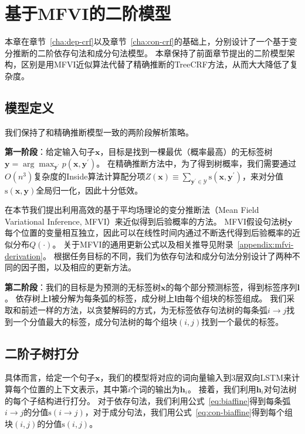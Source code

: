 \section{基于MFVI的二阶模型}\label{sec:vi-2o-approach}

本章在章节~\ref{cha:dep-crf}以及章节~\ref{cha:con-crf}的基础上，分别设计了一个基于变分推断的二阶依存句法和成分句法模型。
本章保持了前面章节提出的二阶模型架构，区别是用MFVI近似算法代替了精确推断的TreeCRF方法，从而大大降低了复杂度。

\subsection{模型定义}\label{sec:vi-model-definition}

我们保持了和精确推断模型一致的两阶段解析策略。

\noindent\textbf{第一阶段}：给定输入句子$\boldsymbol{x}$，目标是找到一棵最优（概率最高）的无标签树$\boldsymbol{y}=\arg\max_{\boldsymbol{y}^{\prime}}p(\boldsymbol{x},\boldsymbol{y}^{\prime})$。
在精确推断方法中，为了得到树概率，我们需要通过$O(n^3)$复杂度的Inside算法计算配分项$Z(\boldsymbol{x})\equiv\sum_{\boldsymbol{y}^{\prime}\in\mathcal{Y}}\mathrm{s}(\boldsymbol{x},\boldsymbol{y}^{\prime})$，来对分值$\mathrm{s}(\boldsymbol{x},\boldsymbol{y})$全局归一化，因此十分低效。

在本节我们提出利用高效的基于平均场理论的变分推断法（Mean Field Variational Inference, MFVI）来近似得到后验概率的方法。
MFVI假设句法树$\boldsymbol{y}$每个位置的变量相互独立，因此可以在线性时间内通过不断迭代得到后验概率的近似分布$Q(\cdot)$。
关于MFVI的通用更新公式以及相关推导见附录~\ref{appendix:mfvi-derivation}。
根据任务目标的不同，我们为依存句法和成分句法分别设计了两种不同的因子图，以及相应的更新方法。

\noindent\textbf{第二阶段}：我们的目标是为预测的无标签树$\boldsymbol{x}$的每个部分预测标签，得到标签序列$\boldsymbol{l}$。
依存树上$\boldsymbol{l}$被分解为每条弧的标签，成分树上$\boldsymbol{l}$由每个组块的标签组成。
我们采取和前述一样的方法，以贪婪解码的方式，为无标签依存句法树的每条弧$i\rightarrow j$找到一个分值最大的标签，成分句法树的每个组块$(i,j)$找到一个最优的标签。

\subsection{二阶子树打分}

具体而言，给定一个句子$\boldsymbol{x}$，我们的模型将对应的词向量输入到3层双向LSTM来计算每个位置的上下文表示，其中第$i$个词的输出为$\mathbf{h}_i$。
接着，我们利用$\mathbf{h}_i$对句法树的每个子结构进行打分。
对于依存句法，我们利用公式~\ref{eq:biaffine}得到每条弧$i\rightarrow j$的分值$\mathrm{s}(i\rightarrow j)$，对于成分句法，我们用公式~\ref{eq:con-biaffine}得到每个组块$(i, j)$的分值$\mathrm{s}(i, j)$。

